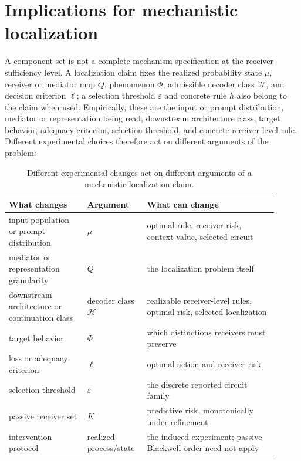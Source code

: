 \section{Implications for mechanistic localization}
\label{sec:discussion}

A component set is not a complete mechanism specification at the receiver-sufficiency level. A localization claim fixes the realized probability state $\mu$, receiver or mediator map $Q$, phenomenon $\Phi$, admissible decoder class $\mathscr H$, and decision criterion $\ell$; a selection threshold $\varepsilon$ and concrete rule $h$ also belong to the claim when used. Empirically, these are the input or prompt distribution, mediator or representation being read, downstream architecture class, target behavior, adequacy criterion, selection threshold, and concrete receiver-level rule. Different experimental choices therefore act on different arguments of the problem:
\begin{table}[t]
\centering
\small
\begin{tabular}{@{}p{0.27\linewidth}p{0.19\linewidth}p{0.45\linewidth}@{}}
\toprule
\textbf{What changes} & \textbf{Argument} & \textbf{What can change} \\
\midrule
input population or prompt distribution & $\mu$ & optimal rule, receiver risk, context value, selected circuit \\
mediator or representation granularity & $Q$ & the localization problem itself \\
downstream architecture or continuation class & decoder class $\mathscr H$ & realizable receiver-level rules, optimal risk, selected localization \\
target behavior & $\Phi$ & which distinctions receivers must preserve \\
loss or adequacy criterion & $\ell$ & optimal action and receiver risk \\
selection threshold & $\varepsilon$ & the discrete reported circuit family \\
passive receiver set & $K$ & predictive risk, monotonically under refinement \\
intervention protocol & realized process/state & the induced experiment; passive Blackwell order need not apply \\
\bottomrule
\end{tabular}
\caption{Different experimental changes act on different arguments of a mechanistic-localization claim.}
\label{tab:localization-arguments}
\end{table}

